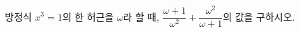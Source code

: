 방정식 $x^3=1$의 한 허근을 $\omega$라 할 때, $\dfrac{\omega+1}{\omega^2}+\dfrac{\omega^2}{\omega+1}$의 값을 구하시오.

